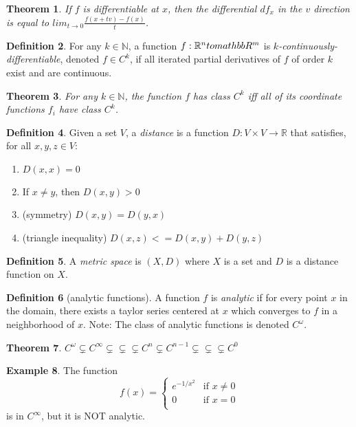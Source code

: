 \documentclass[11pt,leqno,oneside]{amsart}
\newcommand{\N}{{\mathbb N}} %
\newcommand{\R}{{\mathbb R}} %
\newtheorem{thm}{Theorem}[section]
\theoremstyle{definition}
\newtheorem{defn}[thm]{Definition}
\newtheorem{example}[thm]{Example}
\numberwithin{equation}{section}
\begin{document}
\begin{thm}
	If $f$ is differentiable at $x$, then the differential $df_x$ in the $v$ direction is equal to $lim_{t \to 0} \frac{f(x+tv) - f(x)}{t}$.
\end{thm}
\begin{defn}
	For any $k \in \mathbb{N}$, a function $f:\mathbb{R}^n \\to \\mathbb{R}^m$ is \emph{$k$-continuously-differentiable}, denoted $f \in C^k$, if all iterated partial derivatives of $f$ of order $k$ exist and are continuous.
\end{defn}
\begin{thm}
	For any $k \in \N$, the function $f$ has class $C^k$ iff all of its coordinate functions $f_i$ have class $C^k$.
\end{thm}
\begin{defn}
	Given a set $V$, a \emph{distance} is a function $D : V \times V \to \R$ that satisfies, for all $x, y, z \in V$:
	\begin{enumerate}
		\item $D(x,x) = 0$
		\item If $x \neq y$, then $D(x,y) > 0$
		\item (symmetry) $D(x,y) = D(y,x)$
		\item (triangle inequality) $D(x,z) <= D(x,y) + D(y,z)$
	\end{enumerate}
\end{defn}
\begin{defn}
	A \emph{metric space} is $(X, D)$ where $X$ is a set and $D$ is a distance function on $X$.
\end{defn}
\begin{defn}[analytic functions]
	A function $f$ is \emph{analytic} if for every point $x$ in the domain, there exists a taylor series centered at $x$ which converges to $f$ in a neighborhood of $x$.  Note: The class of analytic functions is denoted $C^\omega$.
\end{defn}
\begin{thm}
	$C^\omega \subsetneq C^\infty \subsetneq \subsetneq \subsetneq C^n \subsetneq C^{n-1} \subsetneq \subsetneq \subsetneq C^0$
\end{thm}
\begin{example}
	The function $$f(x) =
	\begin{cases}
		e^{-1/x^2} &\text{if $x \neq 0$} \\
		0 &\text{if $x=0$} \\
	\end{cases}
	$$
	is in $C^\infty$, but it is NOT analytic.
\end{example}
\end{document}
